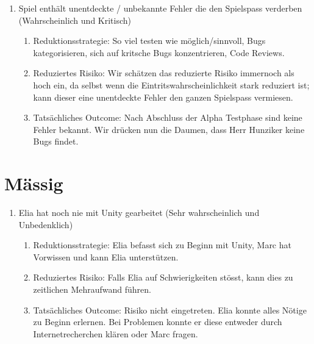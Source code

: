\begin{enumerate}
    \item Spiel enthält unentdeckte / unbekannte Fehler die den Spielspass verderben (Wahrscheinlich und Kritisch)
    \begin{enumerate}
        \item Reduktionsstrategie: So viel testen wie möglich/sinnvoll, Bugs kategorisieren, sich auf kritsche Bugs konzentrieren, Code Reviews.
        \item Reduziertes Risiko: Wir schätzen das reduzierte Risiko immernoch als hoch ein, da selbst wenn die Eintritswahrscheinlichkeit stark reduziert ist; kann dieser eine unentdeckte Fehler den ganzen Spielspass vermiesen.
        \item Tatsächliches Outcome: Nach Abschluss der Alpha Testphase sind keine Fehler bekannt. Wir drücken nun die Daumen, dass Herr Hunziker keine Bugs findet.
    \end{enumerate}

\end{enumerate}

\section{Mässig}
\begin{enumerate}
    \item Elia hat noch nie mit Unity gearbeitet (Sehr wahrscheinlich und Unbedenklich)
    \begin{enumerate}
        \item Reduktionsstrategie: Elia befasst sich zu Beginn mit Unity, Marc hat Vorwissen und kann Elia unterstützen.
        \item Reduziertes Risiko: Falls Elia auf Schwierigkeiten stösst, kann dies zu zeitlichen Mehraufwand führen.
        \item Tatsächliches Outcome: Risiko nicht eingetreten. Elia konnte alles Nötige zu Beginn erlernen. Bei Problemen konnte er diese entweder durch Internetrecherchen klären oder Marc fragen. 
    \end{enumerate}
\end{enumerate}

